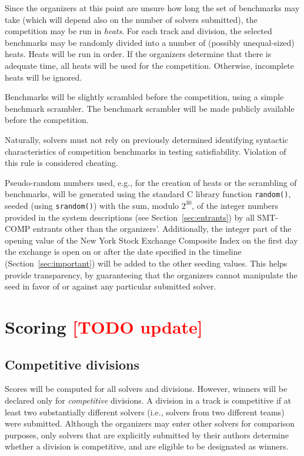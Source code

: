 \documentclass[12pt]{article}
\newcommand{\rem}[1]{\textcolor{red}{[#1]}}
\newcommand{\todo}[1]{\rem{TODO #1}}
\begin{document}
%
Since the organizers at this point are unsure how long the set of
benchmarks may take (which will depend also on the number of solvers
submitted), the competition may be run in \emph{heats}.  For each
track and division, the selected benchmarks may be randomly divided
into a number of (possibly unequal-sized) heats.  Heats will be run in
order.  If the organizers determine that there is adequate time, all
heats will be used for the competition.  Otherwise, incomplete heats
will be ignored.

%
Benchmarks will be slightly scrambled before the competition, using a
simple benchmark scrambler.  The benchmark scrambler will be made
publicly available before the competition.

Naturally, solvers must not rely on previously determined identifying
syntactic characteristics of competition benchmarks in testing
satisfiability.  Violation of this rule is considered cheating.

%
Pseudo-random numbers used, e.g., for the creation of heats or the
scrambling of benchmarks, will be generated using the standard C
library function \texttt{random()}, seeded (using \texttt{srandom()})
with the sum, modulo $2^{30}$, of the integer numbers provided in the
system descriptions (see Section~\ref{sec:entrants}) by all SMT-COMP
entrants other than the organizers'.  Additionally, the integer part
of the opening value of the New York Stock Exchange Composite Index on
the first day the exchange is open on or after the date specified in
the timeline (Section~\ref{sec:important}) will be added to the other
seeding values.  This helps provide transparency, by guaranteeing that
the organizers cannot manipulate the seed in favor of or against any
particular submitted solver.


\section{Scoring \todo{update}}
\label{sec:scoring}

\subsection{Competitive divisions}
  
Scores will be computed for all solvers and divisions.  However,
winners will be declared only for \emph{competitive} divisions.  A
division in a track is competitive if at least two substantially
different solvers (i.e., solvers from two different teams) were
submitted.  Although the organizers may enter other solvers for
comparison purposes, only solvers that are explicitly submitted by
their authors determine whether a division is competitive, and are
eligible to be designated as winners.
\end{document}
